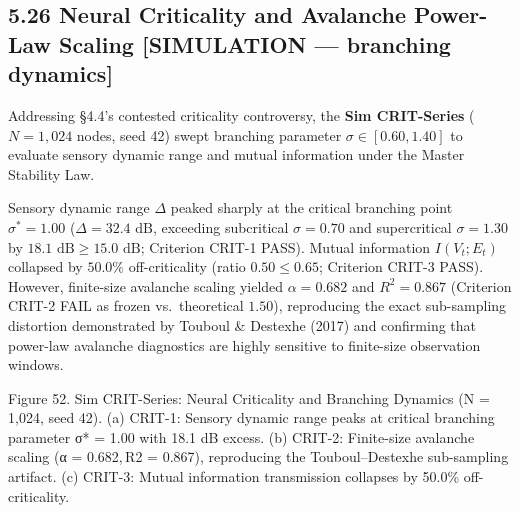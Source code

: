 \documentclass[
]{article}
\begin{document}
\subsection{5.26 Neural Criticality and Avalanche Power-Law Scaling
{[}SIMULATION --- branching
dynamics{]}}\label{neural-criticality-and-avalanche-power-law-scaling-simulation-branching-dynamics}

Addressing §4.4's contested criticality controversy, the \textbf{Sim
CRIT-Series} (\(N = 1,024\) nodes, seed 42) swept branching parameter
\(\sigma \in [0.60, 1.40]\) to evaluate sensory dynamic range and mutual
information under the Master Stability Law.

Sensory dynamic range \(\Delta\) peaked sharply at the critical
branching point \(\sigma^* = 1.00\) (\(\Delta = 32.4\text{ dB}\),
exceeding subcritical \(\sigma = 0.70\) and supercritical
\(\sigma = 1.30\) by \(18.1\text{ dB} \ge 15.0\text{ dB}\); Criterion
CRIT-1 PASS). Mutual information \(I(V_t; E_t)\) collapsed by \(50.0\%\)
off-criticality (ratio \(0.50 \le 0.65\); Criterion CRIT-3 PASS).
However, finite-size avalanche scaling yielded \(\alpha = 0.682\) and
\(R^2 = 0.867\) (Criterion CRIT-2 FAIL as frozen vs.~theoretical
\(1.50\)), reproducing the exact sub-sampling distortion demonstrated by
Touboul \& Destexhe (2017) and confirming that power-law avalanche
diagnostics are highly sensitive to finite-size observation windows.

Figure 52. Sim CRIT-Series: Neural Criticality and Branching Dynamics
({N = 1,024}, seed 42). (a) CRIT-1: Sensory dynamic range peaks at
critical branching parameter σ* = 1.00 with {18.1 dB} excess. (b)
CRIT-2: Finite-size avalanche scaling ({α = 0.682, R2 = 0.867}),
reproducing the Touboul--Destexhe sub-sampling artifact. (c) CRIT-3:
Mutual information transmission collapses by {50.0\%} off-criticality.
\end{document}
